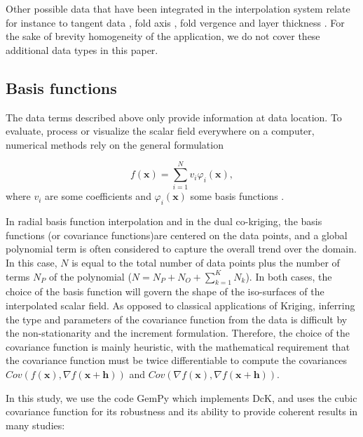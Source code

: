 \documentclass[final]{ring20}
\newcommand{\bx}{\mathbf{x}}
\begin{document}
Other possible data that have been integrated in the interpolation system relate for instance to tangent data \citep{Lajaunie1997MG, Caumon2013GaRSITo, Hillier2014MG}, fold axis \citep{MassiotGM2010,Hillier2014MG}, fold vergence \citep{Laurent2016EaPSL,Grose2017JSG} and layer thickness \citep{Laurent2016MG}. For the sake of brevity homogeneity of the application, we do not cover these additional data types in this paper. 

\subsection{Basis functions} 

The data terms described above only provide information at data location. To evaluate, process or visualize the scalar field everywhere on a computer, numerical methods rely on the general formulation 

\begin{equation}
\label{eq:basis}
  f(\mathbf{x}) = \sum_{i=1}^{N}{v_i\varphi_i(\mathbf{x})},
\end{equation}
\noindent where $v_i$ are some coefficients and $\varphi_i(\mathbf{x})$ some basis functions \citep[e.g., ][]{Hillier2014MG,Renaudeau2019MG,Wellmann2018AiG}.
 
In radial basis function interpolation \citep[RBF, ][]{Carr2001,Cowan2002ASGMEM,Hillier2014MG} and in the dual co-kriging, the basis functions (or covariance functions)are centered on the data points, and a global polynomial term is often considered to capture the overall trend over the domain. In this case, $N$ is equal to the total number of data points plus the number of terms $N_P$ of the polynomial ($N = N_P + N_O + \sum_{k=1}^{K}{N_k}$). In both cases, the choice of the basis function will govern the shape of the iso-surfaces of the interpolated scalar field. As opposed to classical applications of Kriging, inferring the type and parameters of the covariance function from the data is difficult by the non-stationarity and the increment formulation. Therefore, the choice of the covariance function is mainly heuristic, with the mathematical requirement that the covariance function must be twice differentiable to compute the covariances $Cov\left(f(\bx), \nabla {f}(\bx+\mathbf{h})\right)$ and $Cov\left(\nabla f(\bx), \nabla f(\bx+\mathbf{h})\right)$. 

In this study, we use the code GemPy \cite{delaVarga2018GMDD} which implements DcK, and uses the cubic covariance function for its  robustness and its ability to provide coherent results in many studies: 
\end{document}
